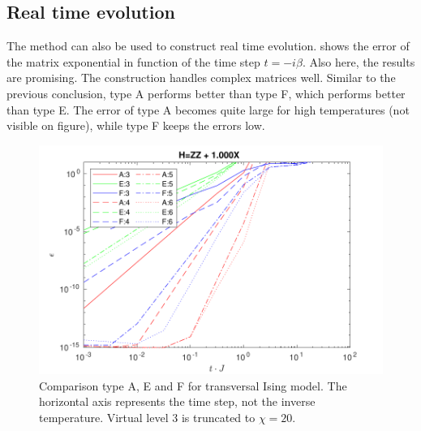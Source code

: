 




\subsection{Real time evolution} \label{subsec_rt_evo}

The method can also be used to construct real time evolution.  shows the error of the matrix exponential in function of the time step $t = -i \beta $. Also here, the results are promising. The construction handles complex matrices well. Similar to the previous conclusion, type A performs better than type F, which performs better than type E. The error of type A becomes quite large for high temperatures (not visible on figure), while type F keeps the errors low.

\begin{figure}[H]
    \center
    \includegraphics[width=\textwidth]{Figuren/benchmarking/1D_t_ising_time.pdf}
    \caption{Comparison type A, E and F for transversal Ising model. The horizontal axis represents the time step, not the inverse temperature. Virtual level 3 is truncated to $\chi=20$.  }
    \label{fig:benchmark:tising_time}
\end{figure}

